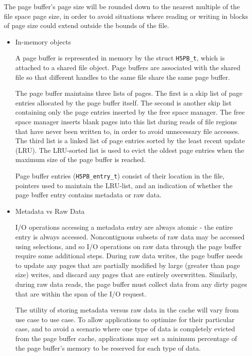 The page buffer's page size will be rounded down to the nearest multiple of the file space page size, in order to avoid situations where reading or writing in blocks of page size could extend outside the bounds of the file.

\begin{itemize}

    \item In-memory objects

A page buffer is represented in memory by the struct \texttt{H5PB\_t}, which is attached to a shared file object. Page buffers are associated with the shared file so that different handles to the same file share the same page buffer.

The page buffer maintains three lists of pages. The first is a skip list of page entries allocated by the page buffer itself. The second is another skip list containing only the page entries inserted by the free space manager. The free space manager inserts blank pages into this list during reads of file regions that have never been written to, in order to avoid unnecessary file accesses. The third list is a linked list of page entries sorted by the least recent update (LRU). The LRU-sorted list is used to evict the oldest page entries when the maximum size of the page buffer is reached.

Page buffer entries (\texttt{H5PB\_entry\_t}) consist of their location in the file, pointers used to maintain the LRU-list, and an indication of whether the page buffer entry contains metadata or raw data.

    \item Metadata vs Raw Data

I/O operations accessing a metadata entry are always atomic - the entire entry is always accessed. Noncontiguous subsets of raw data may be accessed using selections, and so I/O operations on raw data through the page buffer require some additional steps. During raw data writes, the page buffer needs to update any pages that are partially modified by large (greater than page size) writes, and discard any pages that are entirely overwritten. Similarly, during raw data reads, the page buffer must collect data from any dirty pages that are within the span of the I/O request.

The utility of storing metadata versus raw data in the cache will vary from use case to use case. To allow applications to optimize for their particular case, and to avoid a scenario where one type of data is completely evicted from the page buffer cache, applications may set a minimum percentage of the page buffer's memory to be reserved for each type of data.


\end{itemize}
